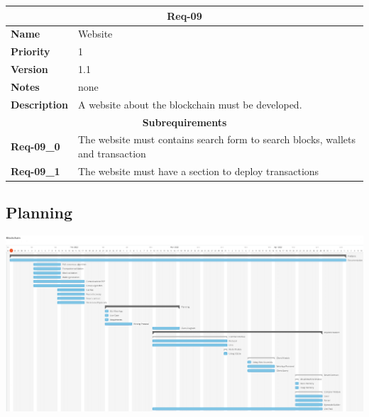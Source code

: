 \documentclass[../documentation.tex]{subfiles}
\begin{document}
\bgroup{}
\def\arraystretch{1.25}
\begin{center}
    \begin{tabular}{ |l|p{9cm}| }
        \hline
        \multicolumn{2}{|c|}{\textbf{Req-09}} \\
        \hline
        \textbf{Name} & Website \\
        \hline
        \textbf{Priority} & 1 \\
        \hline
        \textbf{Version} & 1.1 \\
        \hline
        \textbf{Notes} & none \\
        \hline
        \textbf{Description} & A website about the blockchain must be developed. \\
        \hline
        \multicolumn{2}{|c|}{\textbf{Subrequirements}} \\
        \hline
        \textbf{Req-09\_0} & The website must contains search form to search blocks, wallets and transaction \\
        \hline
        \textbf{Req-09\_1} & The website must have a section to deploy transactions \\
        \hline
    \end{tabular}
\end{center}
\egroup{}

\subsection{Planning}

\includegraphics[width=\textwidth]{images/gantt.png}
\end{document}
